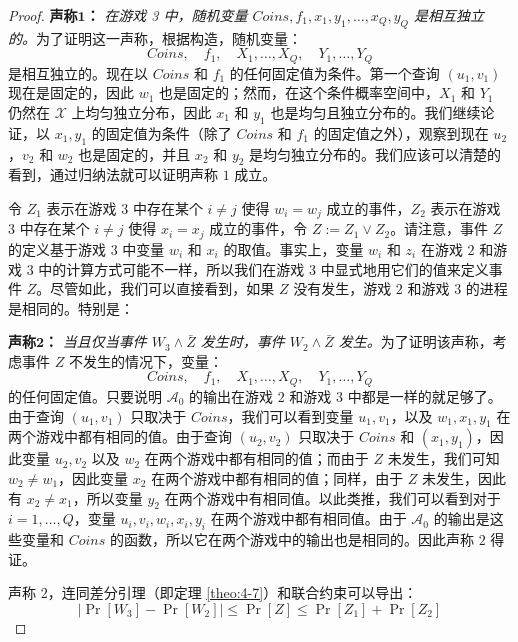 \begin{proof}
\vspace{5pt}

\noindent
\textbf{声称$\mathbf{1}$：}
\emph{在游戏 3 中，随机变量 $Coins,f_1,x_1,y_1,\dots,x_Q,y_Q$ 是相互独立的。}为了证明这一声称，根据构造，随机变量：
\[
Coins,\quad
f_1,\quad
X_1,\dots,X_Q,\quad
Y_1,\dots,Y_Q
\]
是相互独立的。现在以 $Coins$ 和 $f_1$ 的任何固定值为条件。第一个查询 $(u_1,v_1)$ 现在是固定的，因此 $w_1$ 也是固定的；然而，在这个条件概率空间中，$X_1$ 和 $Y_1$ 仍然在 $\mathcal{X}$ 上均匀独立分布，因此 $x_1$ 和 $y_1$ 也是均匀且独立分布的。我们继续论证，以 $x_1,y_1$ 的固定值为条件（除了 $Coins$ 和 $f_1$ 的固定值之外），观察到现在 $u_2$，$v_2$ 和 $w_2$ 也是固定的，并且 $x_2$ 和 $y_2$ 是均匀独立分布的。我们应该可以清楚的看到，通过归纳法就可以证明声称 $1$ 成立。

令 $Z_1$ 表示在游戏 $3$ 中存在某个 $i\neq j$ 使得 $w_i=w_j$ 成立的事件，$Z_2$ 表示在游戏 $3$ 中存在某个 $i\neq j$ 使得 $x_i=x_j$ 成立的事件，令 $Z:=Z_1\lor Z_2$。请注意，事件 $Z$ 的定义基于游戏 $3$ 中变量 $w_i$ 和 $x_i$ 的取值。事实上，变量 $w_i$ 和 $z_i$ 在游戏 $2$ 和游戏 $3$ 中的计算方式可能不一样，所以我们在游戏 $3$ 中显式地用它们的值来定义事件 $Z$。尽管如此，我们可以直接看到，如果 $Z$ 没有发生，游戏 $2$ 和游戏 $3$ 的进程是相同的。特别是：

\vspace{5pt}

\noindent
\textbf{声称$\mathbf{2}$：}
\emph{当且仅当事件 $W_3\land\bar Z$ 发生时，事件 $W_2\land\bar Z$ 发生。}为了证明该声称，考虑事件 $Z$ 不发生的情况下，变量：
\[
Coins,\quad
f_1,\quad
X_1,\dots,X_Q,\quad
Y_1,\dots,Y_Q
\]
的任何固定值。只要说明 $\mathcal{A}_0$ 的输出在游戏 $2$ 和游戏 $3$ 中都是一样的就足够了。由于查询 $(u_1,v_1)$ 只取决于 $Coins$，我们可以看到变量 $u_1,v_1$，以及 $w_1,x_1,y_1$ 在两个游戏中都有相同的值。由于查询 $(u_2,v_2)$ 只取决于 $Coins$ 和 $(x_1,y_1)$，因此变量 $u_2,v_2$ 以及 $w_2$ 在两个游戏中都有相同的值；而由于 $Z$ 未发生，我们可知 $w_2\neq w_1$，因此变量 $x_2$ 在两个游戏中都有相同的值；同样，由于 $Z$ 未发生，因此有 $x_2\neq x_1$，所以变量 $y_2$ 在两个游戏中有相同值。以此类推，我们可以看到对于 $i=1,\dots,Q$，变量 $u_i,v_i,w_i,x_i,y_i$ 在两个游戏中都有相同值。由于 $\mathcal{A}_0$ 的输出是这些变量和 $Coins$ 的函数，所以它在两个游戏中的输出也是相同的。因此声称 $2$ 得证。

声称 $2$，连同差分引理（即定理 \ref{theo:4-7}）和联合约束可以导出：
\begin{equation}\label{eq:4-27}
|\Pr[W_3]-\Pr[W_2]|\leq\Pr[Z]\leq\Pr[Z_1]+\Pr[Z_2]
\end{equation}


\end{proof}
